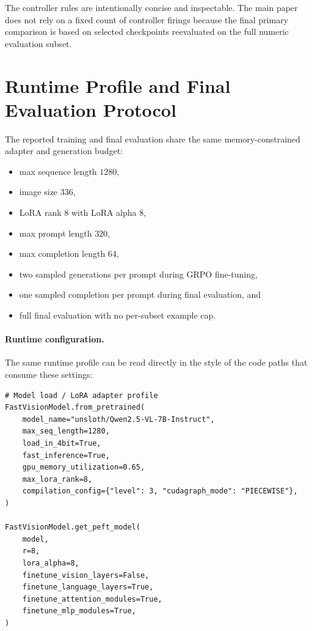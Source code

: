 \documentclass{article} %
\begin{document}
The controller rules are intentionally concise and inspectable. The main paper does not rely on a fixed count of controller firings because the final primary comparison is based on selected checkpoints reevaluated on the full numeric evaluation subset.

\section{Runtime Profile and Final Evaluation Protocol}

The reported training and final evaluation share the same memory-constrained adapter and generation budget:
\begin{itemize}[leftmargin=1.2em]
\item max sequence length $1280$,
\item image size $336$,
\item LoRA rank $8$ with LoRA alpha $8$,
\item max prompt length $320$,
\item max completion length $64$,
\item two sampled generations per prompt during GRPO fine-tuning,
\item one sampled completion per prompt during final evaluation, and
\item full final evaluation with no per-subset example cap.
\end{itemize}

\paragraph{Runtime configuration.}
The same runtime profile can be read directly in the style of the code paths that consume these settings:

\begin{Verbatim}[fontsize=\scriptsize,frame=single,framesep=3mm]
# Model load / LoRA adapter profile
FastVisionModel.from_pretrained(
    model_name="unsloth/Qwen2.5-VL-7B-Instruct",
    max_seq_length=1280,
    load_in_4bit=True,
    fast_inference=True,
    gpu_memory_utilization=0.65,
    max_lora_rank=8,
    compilation_config={"level": 3, "cudagraph_mode": "PIECEWISE"},
)

FastVisionModel.get_peft_model(
    model,
    r=8,
    lora_alpha=8,
    finetune_vision_layers=False,
    finetune_language_layers=True,
    finetune_attention_modules=True,
    finetune_mlp_modules=True,
)
\end{Verbatim}
\end{document}
